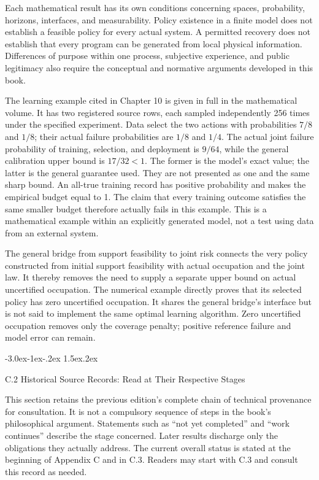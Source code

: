 \documentclass[
  english,
  11pt,
  oneside]{book}
\makeatletter
\renewcommand\section{\@startsection{section}{1}{\z@}%
  {-3.0ex\@plus-1ex\@minus-.2ex}%
  {1.5ex\@plus.2ex}%
  {\normalfont\Large\bfseries\raggedright\hyphenpenalty=10000\exhyphenpenalty=10000}}
\makeatother
\begin{document}
Each mathematical result has its own conditions concerning spaces, probability, horizons, interfaces, and measurability. Policy existence in a finite model does not establish a feasible policy for every actual system. A permitted recovery does not establish that every program can be generated from local physical information. Differences of purpose within one process, subjective experience, and public legitimacy also require the conceptual and normative arguments developed in this book.

The learning example cited in Chapter 10 is given in full in the mathematical volume. It has two registered source rows, each sampled independently 256 times under the specified experiment. Data select the two actions with probabilities \(7/8\) and \(1/8\); their actual failure probabilities are \(1/8\) and \(1/4\). The actual joint failure probability of training, selection, and deployment is \(9/64\), while the general calibration upper bound is \(17/32<1\). The former is the model's exact value; the latter is the general guarantee used. They are not presented as one and the same sharp bound. An all-true training record has positive probability and makes the empirical budget equal to 1. The claim that every training outcome satisfies the same smaller budget therefore actually fails in this example. This is a mathematical example within an explicitly generated model, not a test using data from an external system.

The general bridge from support feasibility to joint risk connects the very policy constructed from initial support feasibility with actual occupation and the joint law. It thereby removes the need to supply a separate upper bound on actual uncertified occupation. The numerical example directly proves that its selected policy has zero uncertified occupation. It shares the general bridge's interface but is not said to implement the same optimal learning algorithm. Zero uncertified occupation removes only the coverage penalty; positive reference failure and model error can remain.

\section{C.2 Historical Source Records: Read at Their Respective Stages}\label{ph-c-2}

This section retains the previous edition's complete chain of technical provenance for consultation. It is not a compulsory sequence of steps in the book's philosophical argument. Statements such as ``not yet completed'' and ``work continues'' describe the stage concerned. Later results discharge only the obligations they actually address. The current overall status is stated at the beginning of Appendix C and in C.3. Readers may start with C.3 and consult this record as needed.
\end{document}
